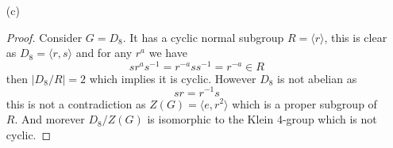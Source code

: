 \documentclass[12pt]{article}
\begin{document}
\begin{enumerate}
\begin{proof}
        Thus $|G_{x_i}| = p$ and therefore $|c(x_i)| = p$. Now writing the class equation of $G$
        \[ |G| = |Z(G)| + \sum_{i = 1}^k |c(x_i)| \]
        then mod p, $|G| = 0$ and $|c(x_i)| = 0$ therefore this implies
        \[ 0 = |Z(G)| \mod p \]
        now together with Lagrange's theorem this implies $|Z(G)| \in \{p, p^2 \}$.

        Case 1: $|Z(G)| = p^2$ then $Z(G) = G$ and then clearly $G$ is abelian
        
        Case 2: $|Z(G)| = p$ then $|G/Z(G)| = p$. Picking any non identity
        element $g \in G/Z(G)$ (which exists as $p > 1$) we must have $|g| = p$ by Lagrange's theorem
        and hence $G/Z(G) = \langle g \rangle$ meaning it is cyclic. Then by part (a),
        $G$ is abelian.
    \end{proof}

    \item[(c)]
    \begin{proof}
        Consider $G = D_8$. It has a cyclic normal subgroup $R = \langle r \rangle$,
        this is clear as $D_8 = \langle r, s \rangle$ and for any $r^a$ we have
        \[ sr^as^{-1} = r^{-a}ss^{-1} = r^{-a} \in R \]
        then $|D_8/R| = 2$ which implies it is cyclic. However $D_8$ is not abelian
        as
        \[ sr = r^{-1}s \]
        this is not a contradiction as $Z(G) = \langle e, r^2 \rangle$ which is a proper subgroup of $R$.
        And morever $D_8/Z(G)$ is isomorphic to the Klein 4-group which is not cyclic.
    \end{proof}
\end{enumerate}
\end{document}
